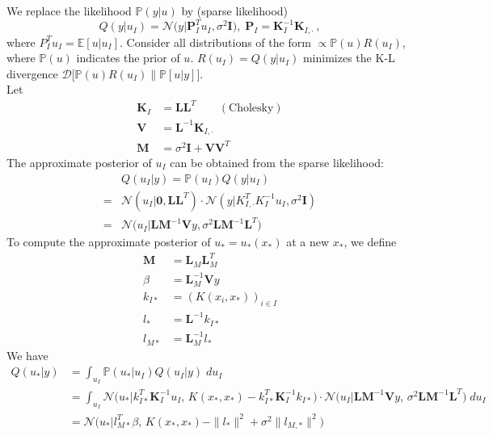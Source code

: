 \documentclass[a4paper,onecolumn]{article}
\begin{document}
We replace the likelihood $\mathbb{P}(y|u)$ by (sparse likelihood)
$$
    Q(y|u_I) = \mathcal{N}\Big(y\Big| \mathbf{P}_I^T u_I, \sigma^2 \mathbf{I}\Big),\; \mathbf{P}_I = \mathbf{K}_I^{-1} \mathbf{K}_{I,\cdot}\,,
$$
where $P_I^T u_I = \mathbb{E}[u| u_I]$.
Consider all distributions of the form $\propto \mathbb{P}(u)R(u_I)$, where $\mathbb{P}(u)$ indicates the prior of $u$.
$R(u_I) = Q(y|u_I)$ minimizes the K-L divergence $\mathcal{D}\Big[\mathbb{P}(u)R(u_I) \Big\| \mathbb{P}[u|y]\Big]$.\\

Let 
\begin{equation*}\begin{split}
    \mathbf{K}_I &= \mathbf{L}\mathbf{L}^T \qquad (\textrm{Cholesky})\\
    \mathbf{V} &= \mathbf{L}^{-1} \mathbf{K}_{I, \cdot}\\
    \mathbf{M} &= \sigma^2 \mathbf{I} + \mathbf{V}\mathbf{V}^T
\end{split}\end{equation*}
The approximate posterior of $u_I$ can be obtained from the sparse likelihood:
\begin{equation*}\begin{split}
    &Q(u_I|y) = \mathbb{P}(u_I) Q(y|u_I) \\
    =& \mathcal{N}(u_I| \mathbf{0}, \mathbf{L}\mathbf{L}^T) \cdot
    \mathcal{N}(y| K_{I, \cdot}^T K_I^{-1}u_I, \sigma^2 \mathbf{I})\\
    =& \mathcal{N} \big( u_I\big| \mathbf{L}\mathbf{M}^{-1} \mathbf{V} y, \sigma^2 \mathbf{L}\mathbf{M}^{-1}\mathbf{L}^T\big)
\end{split}\end{equation*}
To compute the approximate posterior of $u_*=u_*(x_*)$ at a new $x_*$, we define
\begin{equation*}\begin{split}
    \mathbf{M} &= \mathbf{L}_M\mathbf{L}_M^T\\
    \beta &= \mathbf{L}_M^{-1} \mathbf{V}y\\
    k_{I*} &= (K(x_i, x_*))_{i\in I}\\
    l_* &= \mathbf{L}^{-1} k_{I*}\\
    l_{M*} &= \mathbf{L}_M^{-1} l_*
\end{split}\end{equation*}
We have
\begin{equation*}\begin{split}
    Q(u_*|y) &= \int_{u_I} \mathbb{P}(u_*|u_I) Q(u_I|y) \;d u_I\\
    &= \int_{u_I} \mathcal{N}\big(
        u_*\big| k_{I*}^T \mathbf{K}_I^{-1} u_I,\, K(x_*, x_*) - k_{I*}^T\mathbf{K}_I^{-1} k_{I*} \big) \cdot
       \mathcal{N}\big(u_I\big| \mathbf{L}\mathbf{M}^{-1} \mathbf{V}y,\, \sigma^2 \mathbf{L}\mathbf{M}^{-1} \mathbf{L}^T\big) \; du_I\\
    &= \mathcal{N}\big(u_*\big|l_{M*}^T \beta,\, K(x_*, x_*) - \|l_*\|^2 + \sigma^2 \|l_{M,*}\|^2\big)
\end{split}\end{equation*}
\end{document}
